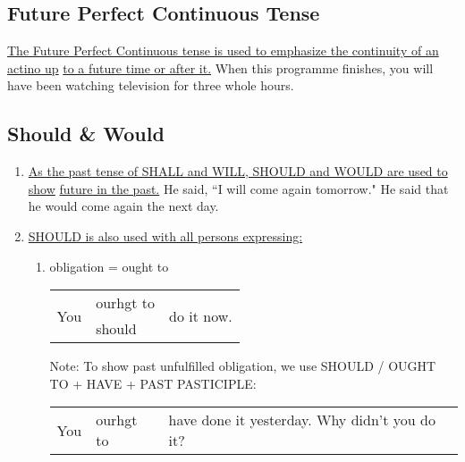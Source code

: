 \subsection{Future Perfect Continuous Tense}
\underline{The Future Perfect Continuous tense is used to emphasize the
continuity of an actino up}
\newline
\underline{to a future time or after it.}
\newline
\newline
When this programme finishes, you will have been watching television for three
whole hours.

\subsection{Should \& Would}
\begin{enumerate}
    \item \underline{As the past tense of SHALL and WILL, SHOULD and WOULD are
        used to show}
        \newline
        \underline{future in the past.}
        \newline
        \newline
        He said, ``I will come again tomorrow."
        \newline
        He said that he would come again the next day.
    \item \underline{SHOULD is also used with all persons expressing:}
        \begin{enumerate}
            \item obligation = ought to
                \newline
                \newline
                \begin{tabular}{lll}
                    \multirow{2}{*}{You} & ourhgt to & \multirow{2}{*}{do it now.} \\
                    & should &
                \end{tabular}
                \newline
                Note: To show past unfulfilled obligation, we use SHOULD / OUGHT
                TO + HAVE + PAST PASTICIPLE:
                \newline
                \newline
                \begin{tabular}{lll}
                    \multirow{2}{*}{You} & ourhgt to & \multirow{2}{*}{have done it yesterday.
                    Why didn't you do it?} \\

\end{tabular}
\end{enumerate}
\end{enumerate}
